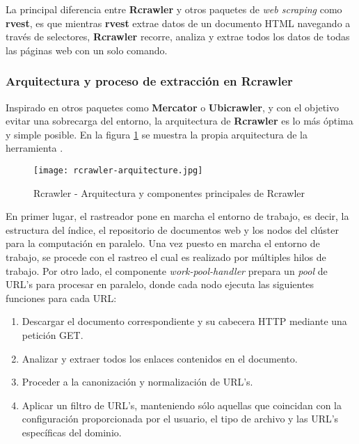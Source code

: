 La principal diferencia entre \textbf{Rcrawler} y otros paquetes de \emph{web scraping} como \textbf{rvest},
es que mientras \textbf{rvest} extrae datos de un documento HTML navegando a través de selectores,
\textbf{Rcrawler} recorre, analiza y extrae todos los datos de todas las páginas web con un solo comando.

\subsubsection{Arquitectura y proceso de extracción en Rcrawler}
\label{subsubsec:arquitectura y proceso de extraccion en rcrawler}

Inspirado en otros paquetes como \textbf{Mercator} o \textbf{Ubicrawler}, y con el objetivo evitar una
sobrecarga del entorno, la arquitectura de \textbf{Rcrawler} es lo más óptima y simple posible. En la
figura \ref{img:rcrawler - arquitectura y componentes principales de rcrawler} se muestra la propia
arquitectura de la herramienta \cite{rcrawler}.

\begin{figure}[tphb]
  \centering
  \texttt{[image: rcrawler-arquitecture.jpg]}
  \caption{Rcrawler - Arquitectura y componentes principales de Rcrawler}
  \label{img:rcrawler - arquitectura y componentes principales de rcrawler}
\end{figure}

En primer lugar, el rastreador pone en marcha el entorno de trabajo, es decir, la estructura del índice, 
el repositorio de documentos web y los nodos del clúster para la computación en paralelo. Una vez puesto 
en marcha el entorno de trabajo, se procede con el rastreo el cual es realizado por múltiples hilos de 
trabajo. Por otro lado, el componente \emph{work-pool-handler} prepara un \emph{pool} de URL's para procesar 
en paralelo, donde cada nodo ejecuta las siguientes funciones para cada URL:

\begin{enumerate}
  \item Descargar el documento correspondiente y su cabecera HTTP mediante una petición GET.
  \item Analizar y extraer todos los enlaces contenidos en el documento.
  \item Proceder a la canonización y normalización de URL's.
  \item Aplicar un filtro de URL's, manteniendo sólo aquellas que coincidan con la configuración 
  proporcionada por el usuario, el tipo de archivo y las URL's específicas del dominio.
\end{enumerate}

